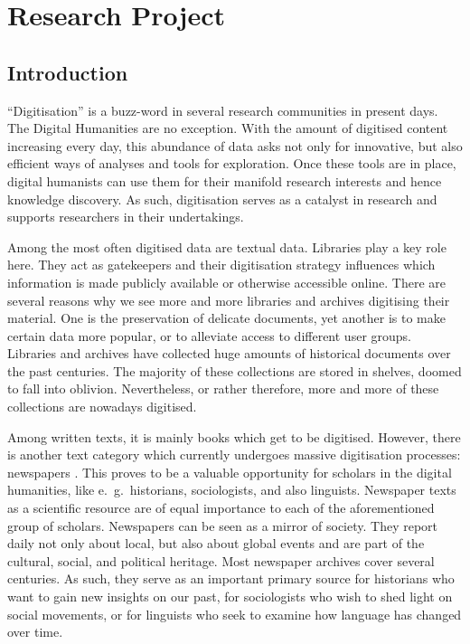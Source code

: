 \section{Research Project}
\subsection{Introduction}
``Digitisation'' is a buzz-word in several research communities in present days. The Digital Humanities are no exception. With the amount of digitised content increasing every day, this abundance of data asks not only for innovative, but also efficient ways of analyses and tools for exploration. Once these tools are in place, digital humanists can use them for their manifold research interests and hence knowledge discovery. As such, digitisation serves as a catalyst in research and supports researchers in their undertakings.

Among the most often digitised data are textual data. Libraries play a key role here. They act as gatekeepers and their digitisation strategy influences which information is made publicly available or otherwise accessible online. There are several reasons why we see more and more libraries and archives digitising their material. One is the preservation of delicate documents, yet another is to make certain data more popular, or to alleviate access to different user groups. Libraries and archives have collected huge amounts of historical documents over the past centuries. The majority of these collections are stored in shelves, doomed to fall into oblivion. Nevertheless, or rather therefore, more and more of these collections are nowadays digitised.

Among written texts, it is mainly books which get to be digitised. However, there is another text category which currently undergoes massive digitisation processes: newspapers \citep{lansdall-welfarecontent2017,prestondigital2016,binghamdigitization2010}. This proves to be a valuable opportunity for scholars in the digital humanities, like e.~g.~historians, sociologists, and also linguists. Newspaper texts as a scientific resource are of equal importance to each of the aforementioned group of scholars. Newspapers can be seen as a mirror of society. They report daily not only about local, but also about global events and are part of the cultural, social, and political heritage. Most newspaper archives cover several centuries. As such, they serve as an important primary source for historians who want to gain new insights on our past, for sociologists who wish to shed light on social movements, or for linguists who seek to examine how language has changed over time.

